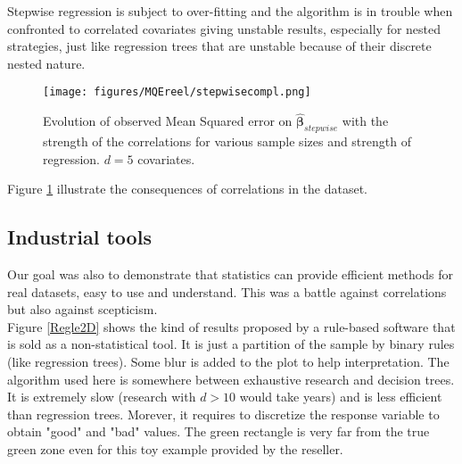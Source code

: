 \documentclass[12pt,a4paper]{report}
\begin{document}
		Stepwise regression is subject to over-fitting and the algorithm is in trouble when confronted to correlated covariates \cite{miller2002subset} giving unstable results, especially for nested strategies, just like regression trees that are unstable because of their discrete nested nature.
\begin{figure}
	 \centering
	  \texttt{[image: figures/MQEreel/stepwisecompl.png]}
	  \caption{Evolution of observed Mean Squared error on $\hat{\boldsymbol{\beta}}_{stepwise}$ with the strength of the correlations for various sample sizes and strength of regression. $d=5$ covariates. } \label{MQEstepwisecompl}
	\end{figure}
	Figure \ref{MQEstepwisecompl} illustrate the consequences of correlations in the dataset.
	
		\FloatBarrier
		\subsection{Industrial tools}
			Our goal was also to demonstrate that statistics can provide efficient methods for real datasets, easy to use and understand.	This was a battle against correlations but also against scepticism. \\
			
			Figure \ref{Regle2D} shows the kind of results proposed by a rule-based software that is sold as a non-statistical tool. It is just a partition of the sample by binary rules (like regression trees). Some blur is added to the plot to help interpretation. The algorithm used here is somewhere between exhaustive research and decision trees. It is extremely slow (research with $d>10$ would take years) and is less efficient than regression trees. Morever, it requires to discretize the response variable to obtain "good" and "bad" values. The green rectangle is very far from the true green zone even for this toy example provided by the reseller.\\
			
\end{document}
